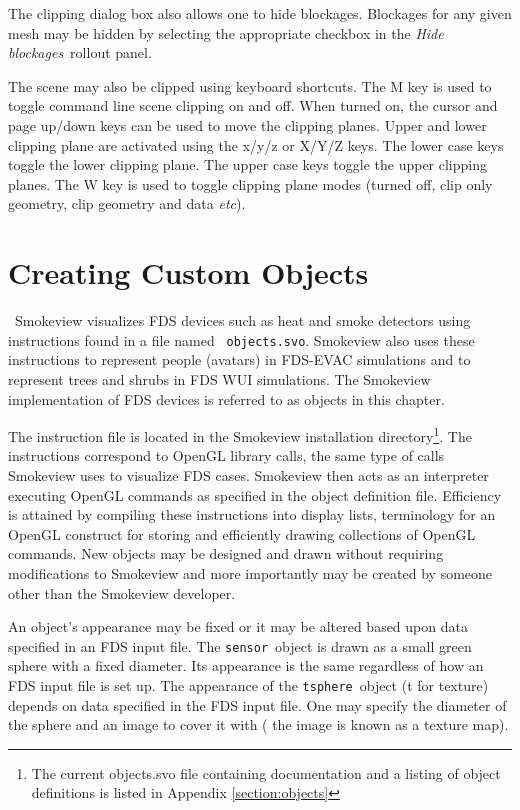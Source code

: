 \documentclass[11pt,twoside]{book}
\begin{document}
The clipping dialog box also allows one to hide blockages.  Blockages for any given mesh may be hidden
by selecting the appropriate checkbox in the {\em Hide blockages}\ rollout panel.

The scene may also be clipped using keyboard shortcuts.
The M key is used to toggle command line scene clipping on and off.  When turned on, the
cursor and page up/down keys can be used to move the clipping planes.
Upper and lower clipping plane are activated using the x/y/z or X/Y/Z keys.
The lower case keys toggle the lower clipping plane.  The upper case
keys toggle the upper clipping planes.
The W key is used to toggle clipping plane modes (turned off, clip only geometry, clip geometry and data
{\em etc}).



\chapter{Creating Custom Objects}
\label{chap:devices}\ Smokeview visualizes FDS devices such as heat
and smoke detectors using instructions found in a file named {\tt
objects.svo}. Smokeview also uses these instructions to represent
people (avatars) in FDS-EVAC simulations and to represent trees
and shrubs in FDS WUI simulations. The Smokeview implementation of
FDS devices is referred to as objects in this chapter.

The instruction file is located in the  Smokeview installation
directory\footnote{The current objects.svo file containing
documentation and a listing of object definitions is listed in
Appendix \ref{section:objects}}. The instructions correspond to
OpenGL library calls, the same type of calls Smokeview uses to
visualize FDS cases. Smokeview then acts as an interpreter
executing OpenGL commands as specified in the object definition
file. Efficiency is attained by compiling these instructions into
display lists, terminology for an OpenGL construct for storing and
efficiently drawing collections of OpenGL commands.  New objects
may be designed and drawn without requiring modifications to
Smokeview and more importantly may be created by someone other
than the Smokeview developer.

An object's appearance may be fixed or it may be altered based
upon data specified in an FDS input file.  The {\tt sensor}\
object is drawn as a small green sphere with a fixed diameter.
Its appearance is the same regardless of how an FDS input file is
set up. The appearance of the {\tt tsphere}\ object (t for
texture) depends on data specified in the FDS input file.  One may
specify the diameter of the sphere and an image to cover it with (
the image is known as a texture map).
\end{document}
